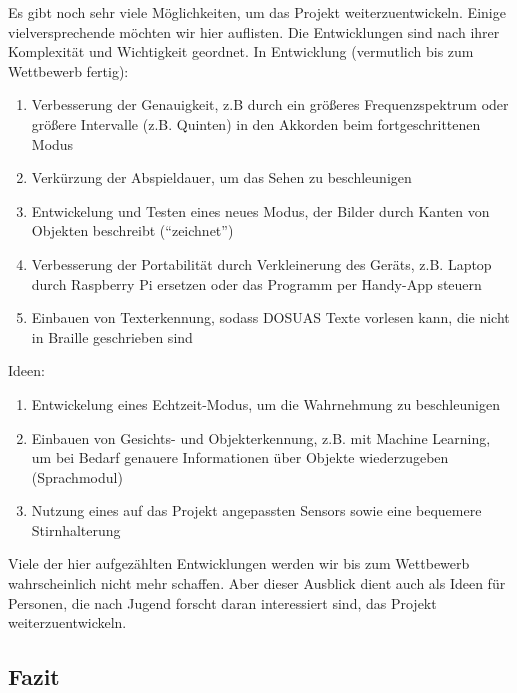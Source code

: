 \documentclass[a4paper,12pt,ngerman]{scrartcl}
\begin{document}
Es gibt noch sehr viele Möglichkeiten, um das Projekt weiterzuentwickeln. Einige vielversprechende
möchten wir hier auflisten. Die Entwicklungen sind nach ihrer Komplexität und Wichtigkeit geordnet.
In Entwicklung (vermutlich bis zum Wettbewerb fertig):
\begin{enumerate}
	\item Verbesserung der Genauigkeit, z.B durch ein größeres Frequenzspektrum oder größere Intervalle (z.B. Quinten) in den
	 Akkorden beim fortgeschrittenen Modus
	\item Verkürzung der Abspieldauer, um das Sehen zu beschleunigen
	\item Entwickelung und Testen eines neues Modus, der Bilder durch Kanten von Objekten beschreibt (\enquote{zeichnet}) 
	\item Verbesserung der Portabilität durch Verkleinerung des Geräts, z.B. Laptop durch Raspberry Pi ersetzen oder das Programm per
	Handy-App steuern
	\item Einbauen von Texterkennung, sodass DOSUAS Texte vorlesen kann, die nicht in Braille geschrieben sind
\end{enumerate}
Ideen:
\begin{enumerate} 
	\item Entwickelung eines Echtzeit-Modus, um die Wahrnehmung zu beschleunigen
	\item Einbauen von Gesichts- und Objekterkennung, z.B. mit Machine Learning, um bei Bedarf genauere 
	Informationen über Objekte wiederzugeben (Sprachmodul)
	\item Nutzung eines auf das Projekt angepassten Sensors sowie eine bequemere Stirnhalterung
\end{enumerate}
Viele der hier aufgezählten Entwicklungen werden wir bis zum Wettbewerb wahrscheinlich nicht 
mehr schaffen. Aber dieser Ausblick dient auch als Ideen für Personen, die nach Jugend forscht 
daran interessiert sind, das Projekt weiterzuentwickeln. 

\subsection{Fazit}
\end{document}
